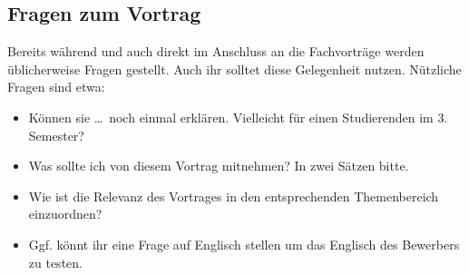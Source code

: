 \subsection{Fragen zum Vortrag}
Bereits während und auch direkt im Anschluss an die Fachvorträge werden üblicherweise Fragen gestellt. Auch ihr solltet diese Gelegenheit nutzen. Nützliche Fragen sind etwa:
\begin{itemize}
    \item Können sie \dots\ noch einmal erklären. Vielleicht für einen Studierenden im 3. Semester?
    \item Was sollte ich von diesem Vortrag mitnehmen? In zwei Sätzen bitte.
    \item Wie ist die Relevanz des Vortrages in den entsprechenden Themenbereich einzuordnen?
    \item Ggf. könnt ihr eine Frage auf Englisch stellen um das Englisch des Bewerbers zu testen.
\end{itemize}


